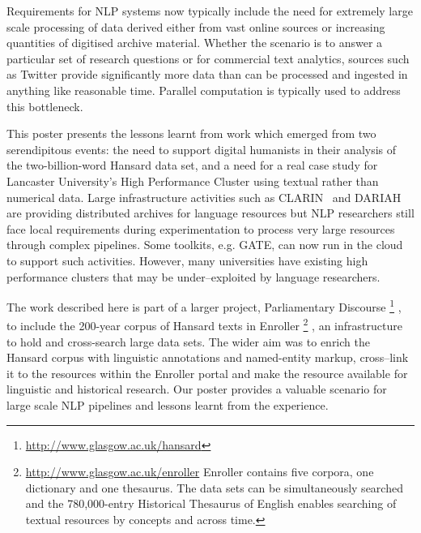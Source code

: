 Requirements for NLP systems now typically include the need for extremely large scale processing of data derived either from vast online sources or increasing quantities of digitised archive material. 
Whether the scenario is to answer a particular set of research questions or for commercial text analytics, sources such as Twitter provide significantly more data than can be processed and ingested in anything like reasonable time. Parallel computation is typically used to address this bottleneck.

This poster presents the lessons learnt from work which emerged from two serendipitous events: the need to support digital humanists in their analysis of the two-billion-word Hansard data set, and a need for a real case study for Lancaster University's High Performance Cluster using textual rather than numerical data. 
Large infrastructure activities such as CLARIN~\cite{varadi2008clarin} and DARIAH~\cite{constantopoulos2008preparing} are providing distributed archives for language resources but NLP researchers still face local requirements during experimentation to process
very large resources through complex pipelines. 
Some toolkits, e.g. GATE, can now run in the cloud~\cite{tablan2013gatecloud} to support such activities. However, many universities have existing high performance clusters that may be under--exploited by language researchers.  

The work described here is part of a larger project, Parliamentary Discourse%
\footnote{\url{http://www.glasgow.ac.uk/hansard}}%
, to include the 200-year corpus of Hansard texts in Enroller%
\footnote{\url{http://www.glasgow.ac.uk/enroller} Enroller contains five corpora, one dictionary and one thesaurus. The data sets can be simultaneously searched and the 780,000-entry Historical Thesaurus of English enables searching of textual resources by concepts and across time.}%
, an infrastructure to hold and cross-search large data sets. The wider aim was to enrich the Hansard corpus with linguistic annotations and named-entity markup, cross--link it to the resources within the Enroller portal and make the resource available for linguistic and historical research. 
Our poster provides a valuable scenario for large scale NLP pipelines and lessons learnt from the experience.
